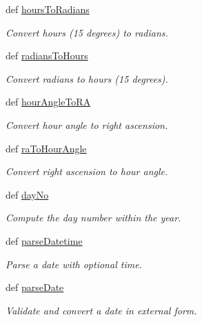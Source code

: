 \begin{DoxyCompactItemize}
\item 
def \hyperlink{namespaceamonpy_1_1sim_1_1sidereal_a38b578fdaa553d893f33f1125ddc83b4}{hours\-To\-Radians}
\begin{DoxyCompactList}\small\item\em Convert hours (15 degrees) to radians. \end{DoxyCompactList}\item 
def \hyperlink{namespaceamonpy_1_1sim_1_1sidereal_aceb8518cc46da6afe750e992d26084e5}{radians\-To\-Hours}
\begin{DoxyCompactList}\small\item\em Convert radians to hours (15 degrees). \end{DoxyCompactList}\item 
def \hyperlink{namespaceamonpy_1_1sim_1_1sidereal_a8ea39d13d3e7787a533dcc3c0d924080}{hour\-Angle\-To\-R\-A}
\begin{DoxyCompactList}\small\item\em Convert hour angle to right ascension. \end{DoxyCompactList}\item 
def \hyperlink{namespaceamonpy_1_1sim_1_1sidereal_a8ed0ba919921f3e67a86446adbedd742}{ra\-To\-Hour\-Angle}
\begin{DoxyCompactList}\small\item\em Convert right ascension to hour angle. \end{DoxyCompactList}\item 
def \hyperlink{namespaceamonpy_1_1sim_1_1sidereal_aed3d5d7c5fd6ad86fd18b9000c9534d8}{day\-No}
\begin{DoxyCompactList}\small\item\em Compute the day number within the year. \end{DoxyCompactList}\item 
def \hyperlink{namespaceamonpy_1_1sim_1_1sidereal_a7d8896425f6ad0b06b434772c558299d}{parse\-Datetime}
\begin{DoxyCompactList}\small\item\em Parse a date with optional time. \end{DoxyCompactList}\item 
def \hyperlink{namespaceamonpy_1_1sim_1_1sidereal_a88742e7ac3f8ecd952771e87c7da5939}{parse\-Date}
\begin{DoxyCompactList}\small\item\em Validate and convert a date in external form. \end{DoxyCompactList}\item 

\end{DoxyCompactItemize}
